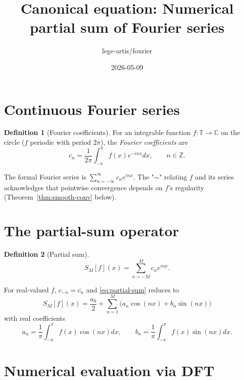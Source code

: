 \documentclass[11pt,a4paper]{article}
\title{Canonical equation: Numerical partial sum of Fourier series}
\author{lege-artis/fourier}
\date{2026-05-09}
\theoremstyle{definition}
\newtheorem{definition}{Definition}
\theoremstyle{plain}
\begin{document}
\maketitle

\section{Continuous Fourier series}

\begin{definition}[Fourier coefficients]
For an integrable function $f: \mathbb{T} \to \mathbb{C}$ on the circle
($f$ periodic with period $2\pi$), the \emph{Fourier coefficients} are
\begin{equation}
\label{eq:psf-coeffs}
c_n = \frac{1}{2\pi} \int_{-\pi}^{\pi} f(x) e^{-i n x} dx, \qquad n \in \mathbb{Z}.
\end{equation}
\end{definition}

The formal Fourier series is $\sum_{n=-\infty}^{\infty} c_n e^{i n x}$.
The "$\sim$" relating $f$ and its series acknowledges that pointwise convergence
depends on $f$'s regularity (Theorem~\ref{thm:smooth-conv} below).

\section{The partial-sum operator}

\begin{definition}[Partial sum]
\label{def:partial-sum}
\begin{equation}
\label{eq:partial-sum}
S_M[f](x) = \sum_{n=-M}^{M} c_n e^{i n x}.
\end{equation}
\end{definition}

For real-valued $f$, $c_{-n} = \overline{c_n}$ and \eqref{eq:partial-sum} reduces to
\begin{equation}
\label{eq:partial-sum-real}
S_M[f](x) = \frac{a_0}{2} + \sum_{n=1}^{M} \big( a_n \cos(nx) + b_n \sin(nx) \big)
\end{equation}
with real coefficients
\begin{equation}
\label{eq:abn-coeffs}
a_n = \frac{1}{\pi} \int_{-\pi}^{\pi} f(x) \cos(nx) dx, \qquad
b_n = \frac{1}{\pi} \int_{-\pi}^{\pi} f(x) \sin(nx) dx.
\end{equation}

\section{Numerical evaluation via DFT}
\end{document}

